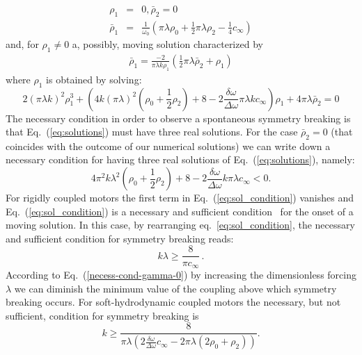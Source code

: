 \documentclass[prl,aps,twocolumn, floatfix, superscriptaddress,showpacs]{revtex4}
\begin{document}
\begin{widetext}
\begin{eqnarray}
\rho_{1}&=&0,\bar{\rho}_{2}=0\\
\bar{\rho}_{1}&=&\frac{1}{\omega_{0}}\left(\pi\lambda\rho_{0}+\frac{1}{2}\pi\lambda\rho_{2}-\frac{1}{4}c_\infty\right)
\end{eqnarray}
and, for $\rho_{1}\neq0$ a, possibly, moving solution characterized by 
\begin{eqnarray}
\bar{\rho}_{1}=\frac{-2}{\pi\lambda k\rho_{1}}\left(\frac{1}{2}\pi\lambda\bar{\rho}_{2}+\rho_{1}\right)
\end{eqnarray}
where $\rho_{1}$ is obtained by solving:
\begin{equation}
2\left(\pi\lambda k\right)^{2}\rho_{1}^{3}+\left(4k\left(\pi\lambda\right)^{2}\left(\rho_{0}+\frac{1}{2}\rho_{2}\right)+8-2\frac{\delta\omega}{\Delta\omega}\pi\lambda k c_\infty\right)\rho_{1}+4\pi\lambda \bar{\rho}_{2}=0
\label{eq:solutions}
\end{equation}
The necessary condition in order to observe a spontaneous symmetry breaking is that Eq.~(\ref{eq:solutions}) must have three real solutions. For the case $\bar\rho_2=0$ (that coincides with the outcome of our numerical solutions) we can write down a necessary condition for having three real solutions of Eq.~(\ref{eq:solutions}), namely:
\begin{equation}
4\pi^{2}k\lambda^{2}\left(\rho_{0}+\frac{1}{2}\rho_{2}\right)+8-2\frac{\delta\omega}{\Delta\omega}k\pi\lambda c_\infty<0.
\label{eq:sol_condition}
\end{equation}
For rigidly coupled motors the first term in Eq.~(\ref{eq:sol_condition}) vanishes and Eq.~(\ref{eq:sol_condition}) is a necessary and sufficient condition~\cite{Guerin2011} for the onset of a moving solution. In this case, by rearranging eq.~\ref{eq:sol_condition}, the necessary and sufficient condition for symmetry breaking reads: 
\begin{equation}
k\lambda\ge\frac{8}{\pi c_\infty}\,.
\label{necess-cond-gamma-0}
\end{equation}
According to Eq.~(\ref{necess-cond-gamma-0}) by increasing the dimensionless forcing $\lambda$ we can diminish the minimum value of the coupling above which  symmetry breaking occurs. For soft-hydrodynamic coupled motors the necessary, but not sufficient, condition for symmetry breaking is  
\begin{equation}
k\geq\frac{8}{\pi\lambda\left(2\frac{\delta\omega}{\Delta\omega}c_\infty-2\pi\lambda(2\rho_0+\rho_2)\right)}.

\end{equation}
\end{widetext}
\end{document}
